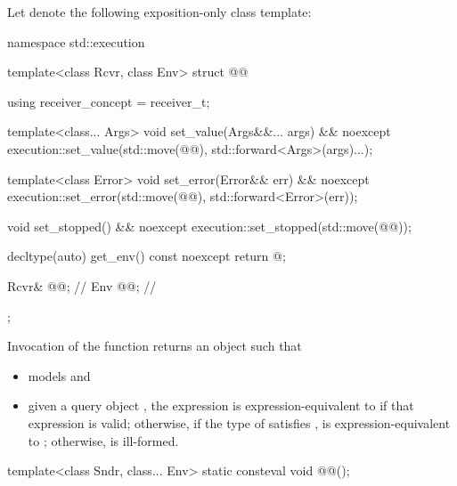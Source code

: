 \pnum
Let  denote the following exposition-only class template:
\begin{codeblock}
namespace std::execution {
  template<class Rcvr, class Env>
  struct @@ {
    using receiver_concept = receiver_t;

    template<class... Args>
    void set_value(Args&&... args) && noexcept {
      execution::set_value(std::move(@@), std::forward<Args>(args)...);
    }

    template<class Error>
    void set_error(Error&& err) && noexcept {
      execution::set_error(std::move(@@), std::forward<Error>(err));
    }

    void set_stopped() && noexcept {
      execution::set_stopped(std::move(@@));
    }

    decltype(auto) get_env() const noexcept {
      return @\seebelow@;
    }

    Rcvr& @@;                 // \expos
    Env @@;                    // \expos
  };
}
\end{codeblock}
Invocation of the function 
returns an object  such that
\begin{itemize}
\item
{} models  and
\item
given a query object ,
the expression  is expression-equivalent
to  if that expression is valid;
otherwise,
if the type of  satisfies ,
 is expression-equivalent
to ;
otherwise,
 is ill-formed.
\end{itemize}

\begin{itemdecl}
template<class Sndr, class... Env>
  static consteval void @@();
\end{itemdecl}


